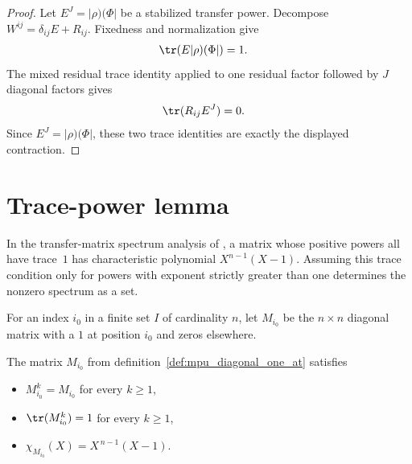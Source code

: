 \begin{proof}\leanok
    Let $E^J=|\rho)(\Phi|$ be a stabilized transfer power.  Decompose
    $W^{ij}=\delta_{ij}E+R_{ij}$.  Fixedness and normalization give
    \begin{align}
        \tr(E|\rho)(\Phi|) & =1.
    \end{align}
    The mixed residual trace identity applied to one residual factor followed
    by $J$ diagonal factors gives
    \begin{align}
        \tr(R_{ij}E^J) & =0.
    \end{align}
    Since $E^J=|\rho)(\Phi|$, these two trace identities are exactly the
    displayed contraction.
\end{proof}

\section{Trace-power lemma}\label{sec:mpu_trace_power}

In the transfer-matrix spectrum analysis of
\cite[Proposition~1]{Cirac2017MPU}, a matrix whose positive powers all have
trace~$1$ has characteristic polynomial $X^{n-1}(X-1)$. Assuming this trace
condition only for powers with exponent strictly greater than one determines
the nonzero spectrum as a set.

\begin{definition}
    \label{def:mpu_diagonal_one_at}
    \leanok
    For an index $i_0$ in a finite set $I$ of cardinality $n$, let $M_{i_0}$ be the $n\times n$
    diagonal matrix with a $1$ at position $i_0$ and zeros elsewhere.
\end{definition}

\begin{lemma}
    \label{lem:mpu_diagonal_one_at}
    \leanok
    The matrix $M_{i_0}$ from definition~\ref{def:mpu_diagonal_one_at} satisfies
    \begin{itemize}
        \item $M_{i_0}^k = M_{i_0}$ for every $k\ge 1$,
        \item $\tr(M_{i_0}^k) = 1$ for every $k\ge 1$,
        \item $\chi_{M_{i_0}}(X) = X^{\,n-1}(X-1)$.
    \end{itemize}
\end{lemma}

